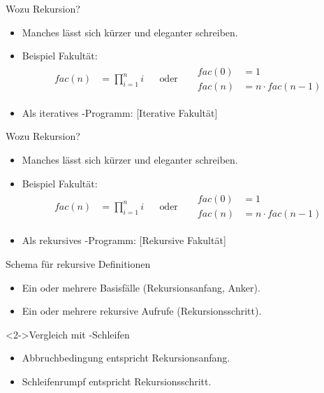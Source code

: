 \begin{frame}
    \begin{block}{Wozu Rekursion?}
    \begin{itemize}
        \item Manches lässt sich kürzer und eleganter schreiben.
        \item<2-> Beispiel Fakultät:
            \begin{align*}
                fac(n) &= \prod_{i=1}^{n}{i} & &\text{oder} & &\begin{aligned} fac(0)& = 1 \\ fac(n) &= n \cdot fac(n-1) \end{aligned}
            \end{align*}
        \item<3-> Als iteratives -Programm:
        [Iterative Fakultät]
    \end{itemize}
    \end{block}
\end{frame}

\begin{frame}
    \begin{block}{Wozu Rekursion?}
    \begin{itemize}
        \item Manches lässt sich kürzer und eleganter schreiben.
        \item Beispiel Fakultät:
            \begin{align*}
                fac(n) &= \prod_{i=1}^{n}{i} & &\text{oder} & &\begin{aligned} fac(0)& = 1 \\ fac(n) &= n \cdot fac(n-1) \end{aligned}
            \end{align*}
        \item Als rekursives -Programm:
        [Rekursive Fakultät]
    \end{itemize}
    \end{block}
\end{frame}

\begin{frame}
    \begin{block}{Schema für rekursive Definitionen}
    \begin{itemize}
        \item Ein oder mehrere Basisfälle (Rekursionsanfang, Anker).
        \item Ein oder mehrere rekursive Aufrufe (Rekursionsschritt).
    \end{itemize}
    \end{block}
    \begin{block}<2->{Vergleich mit -Schleifen}
    \begin{itemize}
        \item Abbruchbedingung entspricht Rekursionsanfang.
        \item Schleifenrumpf entspricht Rekursionsschritt.
    \end{itemize}
    \end{block}
\end{frame}
